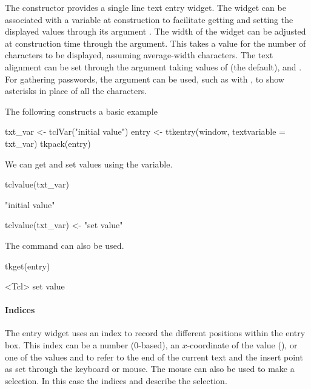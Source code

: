 The  constructor provides a single line text
entry widget. The widget can be associated with a \TCL\/ variable at
construction to facilitate getting and setting the displayed values
through its argument . The width of
the widget can be adjusted at construction time through the
 argument. This takes a value for the number
of characters to be displayed, assuming average-width characters.  The
text alignment can be set through the 
argument taking values of  (the default), 
and . For gathering passwords, the argument
 can be used, such as with
\qcode{*}, to show asterisks in place of all the
characters.

The following constructs a basic example
\begin{Schunk}
\begin{Sinput}
 txt_var <- tclVar("initial value")
 entry <- ttkentry(window, textvariable = txt_var)
 tkpack(entry)
\end{Sinput}
\end{Schunk}

We can get and set values using the \TCL\/ variable.
\begin{Schunk}
\begin{Sinput}
 tclvalue(txt_var)
\end{Sinput}
\begin{Soutput}
[1] "initial value"
\end{Soutput}
\begin{Sinput}
 tclvalue(txt_var) <- "set value"
\end{Sinput}
\end{Schunk}

The  command can also be used.
\begin{Schunk}
\begin{Sinput}
 tkget(entry)
\end{Sinput}
\begin{Soutput}
<Tcl> set value 
\end{Soutput}
\end{Schunk}

\paragraph{Indices}
The entry widget uses an index to record the different positions
within the entry box. This index can be a number (0-based), an
$x$-coordinate of the value (), or one of the values
 and  to refer to the end of the current text
and the insert point as set through the keyboard or mouse. The mouse
can also be used to make a selection. In this case the indices
 and  describe the selection.

